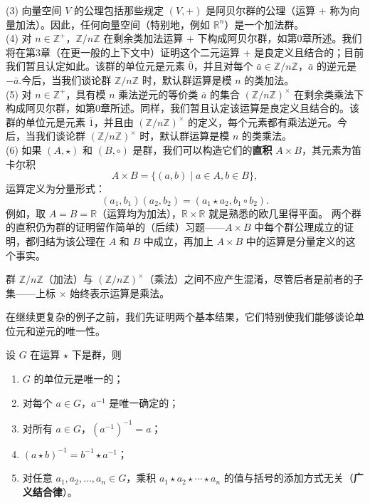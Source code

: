 \addtocounter{example}{-1}
\begin{example}[续]
(3) 向量空间 \( V \) 的公理包括那些规定 \( (V, +) \) 是阿贝尔群的公理（运算 \( + \) 称为向量加法）。因此，任何向量空间（特别地，例如 \( \mathbb{R}^n \)）是一个加法群。\\
(4) 对 \( n \in \mathbb{Z}^+ \)，\(\mathbb{Z}/n\mathbb{Z} \) 在剩余类加法运算 \( + \) 下构成阿贝尔群，如第0章所述。我们将在第3章（在更一般的上下文中）证明这个二元运算 \( + \) 是良定义且结合的；目前我们暂且认定如此。该群的单位元是元素 \( \bar{0} \)，并且对每个 \( \bar{a} \in \mathbb{Z}/n\mathbb{Z} \)，\( \bar{a} \) 的逆元是 \( -\bar{a} \).今后，当我们谈论群 \( \mathbb{Z}/n\mathbb{Z} \) 时，默认群运算是模 \( n \) 的类加法。\\
(5) 对 \( n \in \mathbb{Z}^+ \)，具有模 \( n \) 乘法逆元的等价类 \( \bar{a} \) 的集合 \( (\mathbb{Z}/n\mathbb{Z})^\times \) 在剩余类乘法下构成阿贝尔群，如第0章所述。同样，我们暂且认定该运算是良定义且结合的。该群的单位元是元素 \( \bar{1} \)，并且由 \( (\mathbb{Z}/n\mathbb{Z})^\times \) 的定义，每个元素都有乘法逆元。今后，当我们谈论群 \( (\mathbb{Z}/n\mathbb{Z})^\times \) 时，默认群运算是模 \( n \) 的类乘法。\\
(6) 如果 \((A, \star)\) 和 \((B, \circ)\) 是群，我们可以构造它们的\textbf{直积} \(A \times B\)，其元素为笛卡尔积
\[
A \times B = \{(a, b) \mid a \in A, b \in B\},
\]
运算定义为分量形式：
\[
(a_1, b_1)(a_2, b_2) = (a_1 \star a_2, b_1 \circ b_2).
\]
例如，取 \(A = B = \mathbb{R}\)（运算均为加法），\(\mathbb{R} \times \mathbb{R}\) 就是熟悉的欧几里得平面。
两个群的直积仍为群的证明留作简单的（后续）习题——\( A \times B \) 中每个群公理成立的证明，都归结为该公理在 \( A \) 和 \( B \) 中成立，再加上 \( A \times B \) 中的运算是分量定义的这个事实。
\end{example}

群 \( \mathbb{Z}/n\mathbb{Z} \)（加法）与 \( (\mathbb{Z}/n\mathbb{Z})^\times \)（乘法）之间不应产生混淆，尽管后者是前者的子集——上标 \( \times \) 始终表示运算是乘法。

在继续更复杂的例子之前，我们先证明两个基本结果，它们特别使我们能够谈论单位元和逆元的唯一性。

\begin{proposition}
设 \(G\) 在运算 \(\star\) 下是群，则
\begin{enumerate}[label=(\arabic*)]
\item \(G\) 的单位元是唯一的；
\item 对每个 \(a \in G\)，\(a^{-1}\) 是唯一确定的；
\item 对所有 \(a \in G\)，\((a^{-1})^{-1} = a\)；
\item \((a \star b)^{-1} = b^{-1} \star a^{-1}\)；
\item 对任意 \(a_1, a_2, \ldots, a_n \in G\)，乘积 \(a_1 \star a_2 \star \cdots \star a_n\) 的值与括号的添加方式无关（\textbf{广义结合律}）。
\end{enumerate}
\end{proposition}

